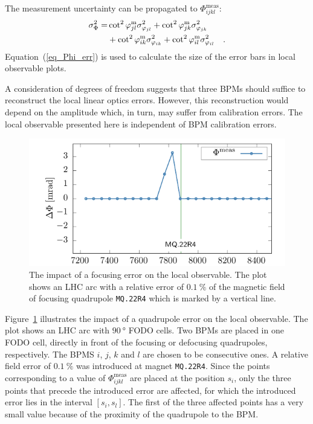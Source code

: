 %
The measurement uncertainty can be propagated to $\Phi_{ijkl}^\text{meas}$:
%
\begin{align}
  \sigma_\Phi^2 =& 
    \cot^2\varphi_{jl}^\text{m} \sigma_{\varphi_{jl}}^2
    + \cot^2\varphi_{jk}^\text{m} \sigma_{\varphi_{jk}}^2 \notag \\
    &+ \cot^2\varphi_{ik}^\text{m} \sigma_{\varphi_{ik}}^2 
    + \cot^2\varphi_{il}^\text{m} \sigma_{\varphi_{il}}^2
  \quad .
  \label{eq_Phi_err}
\end{align}
%
Equation~(\ref{eq_Phi_err}) is used to calculate the size of the error bars in local observable plots.

A consideration of degrees of freedom suggests that three BPMs should suffice to reconstruct
the local linear optics errors. However, this reconstruction would depend on the amplitude which,
in turn, may suffer from calibration errors. The local observable presented here is independent of
BPM calibration errors.
%
\begin{figure}[h]
  \centering
  \includegraphics[width=.7\linewidth]{./sim_locality.pdf}
  \caption{The impact of a focusing error on the local observable. The plot shows an LHC arc with a
    relative error of $\SI{0.1}{\percent}$ of the magnetic field of focusing quadrupole \texttt{MQ.22R4}
    which is marked by a vertical line.
  }
  \label{fig_locality}
\end{figure}
%
Figure~\ref{fig_locality} illustrates the impact of a quadrupole error on the local observable.
The plot shows an LHC arc with $\SI{90}{\degree}$ FODO cells. Two BPMs are placed in one FODO cell, directly
in front of the focusing or defocusing quadrupoles, respectively.
The BPMS $i$, $j$, $k$ and $l$ are chosen to be consecutive ones.
A relative field error of $\SI{0.1}{\percent}$ was introduced at magnet \texttt{MQ.22R4}. Since the
points corresponding to a value of $\Phi_{ijkl}^\text{meas}$ are placed at the position $s_i$, only
the three points that precede the introduced error are affected, for which the introduced error lies
in the interval $[s_i, s_l]$.
The first of the three affected points has a very small value because of the proximity of the quadrupole
to the BPM.

